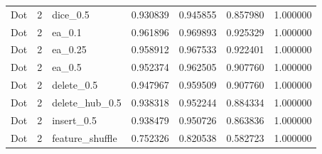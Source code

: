 \documentclass[UTF8,a4paper,11pt,fontset=fandol]{ctexart}
\begin{document}
{\begin{longtable}{lrlrrrr}
Dot & 2 & dice\_0.5 & 0.930839 & 0.945855 & 0.857980 & 1.000000 \\
Dot & 2 & ea\_0.1 & 0.961896 & 0.969893 & 0.925329 & 1.000000 \\
Dot & 2 & ea\_0.25 & 0.958912 & 0.967533 & 0.922401 & 1.000000 \\
Dot & 2 & ea\_0.5 & 0.952374 & 0.962505 & 0.907760 & 1.000000 \\
Dot & 2 & delete\_0.5 & 0.947967 & 0.959509 & 0.907760 & 1.000000 \\
Dot & 2 & delete\_hub\_0.5 & 0.938318 & 0.952244 & 0.884334 & 1.000000 \\
Dot & 2 & insert\_0.5 & 0.938479 & 0.950726 & 0.863836 & 1.000000 \\
Dot & 2 & feature\_shuffle & 0.752326 & 0.820538 & 0.582723 & 1.000000 \\
\end{longtable}
}
\end{document}
